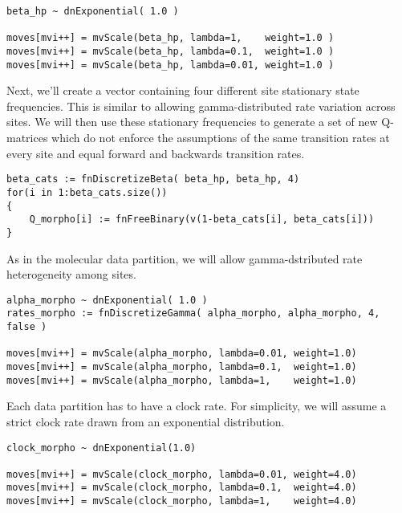 {\tt \begin{snugshade*}
\begin{lstlisting}
beta_hp ~ dnExponential( 1.0 )

moves[mvi++] = mvScale(beta_hp, lambda=1,    weight=1.0 )
moves[mvi++] = mvScale(beta_hp, lambda=0.1,  weight=1.0 )
moves[mvi++] = mvScale(beta_hp, lambda=0.01, weight=1.0 )
\end{lstlisting}
\end{snugshade*}}

Next, we'll create a vector containing four different site stationary state frequencies. 
This is similar to allowing gamma-distributed rate variation across sites. 
We will then use these stationary frequencies to generate a set of new Q-matrices which do not enforce the assumptions of the same transition rates at every site and equal forward and backwards transition rates.

{\tt \begin{snugshade*}
\begin{lstlisting}
beta_cats := fnDiscretizeBeta( beta_hp, beta_hp, 4)
for(i in 1:beta_cats.size())
{
    Q_morpho[i] := fnFreeBinary(v(1-beta_cats[i], beta_cats[i]))
}
\end{lstlisting}
\end{snugshade*}}


As in the molecular data partition, we will allow gamma-dstributed rate heterogeneity among sites.
{\tt \begin{snugshade*}
\begin{lstlisting}
alpha_morpho ~ dnExponential( 1.0 )
rates_morpho := fnDiscretizeGamma( alpha_morpho, alpha_morpho, 4, false )

moves[mvi++] = mvScale(alpha_morpho, lambda=0.01, weight=1.0)
moves[mvi++] = mvScale(alpha_morpho, lambda=0.1,  weight=1.0)
moves[mvi++] = mvScale(alpha_morpho, lambda=1,    weight=1.0)
\end{lstlisting}
\end{snugshade*}}

Each data partition has to have a clock rate. For simplicity, we will assume a strict clock rate drawn from an exponential distribution.

{\tt \begin{snugshade*}
\begin{lstlisting}
clock_morpho ~ dnExponential(1.0)

moves[mvi++] = mvScale(clock_morpho, lambda=0.01, weight=4.0)
moves[mvi++] = mvScale(clock_morpho, lambda=0.1,  weight=4.0)
moves[mvi++] = mvScale(clock_morpho, lambda=1,    weight=4.0)
\end{lstlisting}
\end{snugshade*}}

